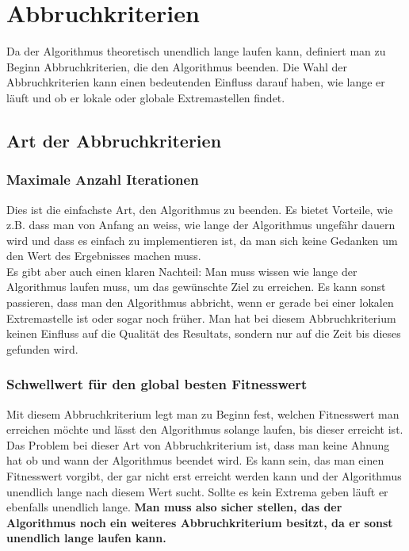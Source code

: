 \section{Abbruchkriterien}

Da der Algorithmus theoretisch unendlich lange laufen kann, definiert man zu Beginn Abbruchkriterien, die den Algorithmus beenden.
Die Wahl der Abbruchkriterien kann einen bedeutenden Einfluss darauf haben, wie lange er läuft und ob er lokale oder globale Extremastellen findet.

\subsection{Art der Abbruchkriterien}

\subsubsection{Maximale Anzahl Iterationen}
Dies ist die einfachste Art, den Algorithmus zu beenden. Es bietet Vorteile, wie z.B. dass man von Anfang an weiss, wie lange der Algorithmus ungefähr dauern wird und dass es einfach zu implementieren ist, da man sich keine Gedanken um den Wert des Ergebnisses machen muss. \\
Es gibt aber auch einen klaren Nachteil: Man muss wissen wie lange der Algorithmus laufen muss, um das gewünschte Ziel zu erreichen. Es kann sonst passieren, dass man den Algorithmus abbricht, wenn er gerade bei einer lokalen Extremastelle ist oder sogar noch früher. Man hat bei diesem Abbruchkriterium keinen Einfluss auf die Qualität des Resultats, sondern nur auf die Zeit bis dieses gefunden wird.

\subsubsection{Schwellwert für den global besten Fitnesswert}
Mit diesem Abbruchkriterium legt man zu Beginn fest, welchen Fitnesswert man erreichen möchte und lässt den Algorithmus solange laufen, bis dieser erreicht ist.\\
Das Problem bei dieser Art von Abbruchkriterium ist, dass man keine Ahnung hat ob und wann der Algorithmus beendet wird. Es kann sein, das man einen Fitnesswert vorgibt, der gar nicht erst erreicht werden kann und der Algorithmus unendlich lange nach diesem Wert sucht. Sollte es kein Extrema geben läuft er ebenfalls unendlich lange. \textbf{Man muss also sicher stellen, das der Algorithmus noch ein weiteres Abbruchkriterium besitzt, da er sonst unendlich lange laufen kann.}

